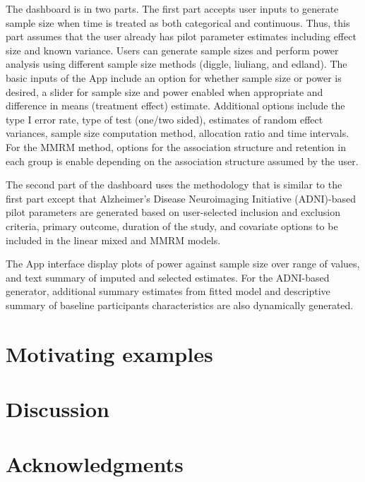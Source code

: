 \documentclass[oupdraft]{bio}
\begin{document}
The dashboard is in two parts. The first part accepts user inputs to generate sample size when time is treated as both categorical and continuous. Thus, this part assumes that the user already has pilot parameter estimates including effect size and known variance. Users can generate sample sizes and perform power analysis using different sample size methods (diggle, liuliang, and edland). The basic inputs of the App include an option for whether sample size or power is desired, a slider for sample size and power enabled when appropriate and difference in means (treatment effect) estimate. Additional options include the type I error rate, type of test (one/two sided), estimates of random effect variances, sample size computation method, allocation ratio and time intervals. For the MMRM method, options for the association structure and retention in each group is enable depending on the association structure assumed by the user. 

The second part of the dashboard uses the methodology that is similar to the first part except that Alzheimer's Disease Neuroimaging Initiative (ADNI)-based pilot parameters are generated based on user-selected inclusion and exclusion criteria, primary outcome, duration of the study, and covariate options to be included in the linear mixed and MMRM models. 

The App interface display plots of power against sample size over range of values, and text summary of imputed and selected estimates. For the ADNI-based generator, additional summary estimates from fitted model and descriptive summary of baseline participants characteristics are also dynamically generated.


\section{Motivating examples}
\label{sec3}

\section{Discussion}
\label{sec4}




\section*{Acknowledgments}
\end{document}
